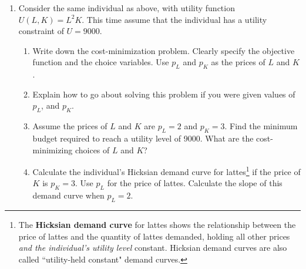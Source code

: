\begin{enumerate}
\begin{enumerate}
    \end{enumerate}











\item Consider the same individual as above, with utility function $U(L, K)=L^2K$. This time assume that the individual has a utility constraint of $U=9000$.

    \begin{enumerate}

    \item Write down the cost-minimization problem. Clearly specify the objective function and the choice variables. Use $p_L$ and $p_K$ as the prices of $L$ and $K$.


    \item Explain how to go about solving this problem if you were given values of $p_L$, and $p_K$.


    \item Assume the prices of $L$ and $K$ are $p_L=2$ and $p_K=3$. Find the minimum budget required to reach a utility level of 9000. What are the cost-minimizing choices of $L$ and $K$?


    \item \label{hickslatte} Calculate the individual's Hicksian demand curve for lattes\footnote{The \textbf{Hicksian demand curve} for lattes shows the relationship between the price of lattes and the quantity of lattes demanded, holding all other prices \emph{and the individual's utility level} constant. Hicksian demand curves are also called ``utility-held constant" demand curves.} if the price of $K$ is $p_K=3$. Use $p_L$ for the price of lattes. Calculate the slope of this demand curve when $p_L=2$.



\end{enumerate}
\end{enumerate}
